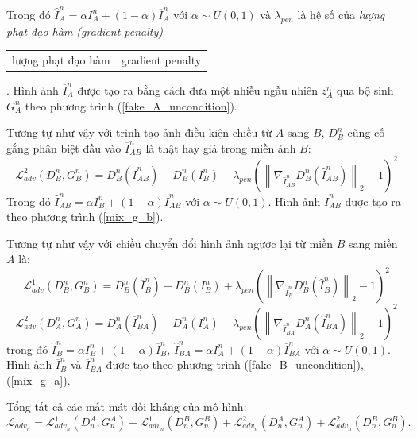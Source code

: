 \documentclass[12pt]{report}%
\newcommand{\word}[2]{%
    \refstepcounter{word}%
    \textit{#1 (#2)}%
    \addcontentsline{wor}{word}
    {\protect
    \begin{tabular}{p{6.2cm}p{6cm}}
        \MakeLowercase{#1} & \MakeLowercase{#2}\\
    \end{tabular}
    }
}
\begin{document}
Trong đó $\widehat I_A^n = \alpha I_A^n + \left( {1 - \alpha } \right)\overline I _A^n$ với $\alpha  \sim U\left( {0,1} \right)$ và $\lambda_{pen}$ là hệ số của \word{lượng phạt đạo hàm}{gradient penalty}. Hình ảnh $\overline I_A ^n$ được tạo ra bằng cách đưa một nhiễu ngẫu nhiên $z_A ^n$ qua bộ sinh $G_A ^n$ theo phương trình (\ref{fake_A_uncondition}).

Tương tự như vậy với trình tạo ảnh điều kiện chiều từ $A$ sang $B$, $D_B ^n$ cũng  cố gắng phân biệt đầu vào $\overline{I}_{AB} ^n$ là thật hay giả trong miền ảnh $B$:
\begin{equation}
    \mathcal{L}_{adv} ^2 \left( D_B ^n, G_B ^n \right)  = D_B^n\left( {\overline I _{AB}^n} \right) - D_B^n\left( {I_B^n} \right) + {\lambda _{pen}}{\left( {{{\left\| {{\nabla _{\widehat I_{AB}^n}}D_B^n\left( {\widehat I_{AB}^n} \right)} \right\|}_2} - 1} \right)^2}
\end{equation}
Trong đó $\widehat I_{AB}^n = \alpha I_B^n + \left( {1 - \alpha } \right)\overline I _{AB}^n$ với $\alpha  \sim U\left( {0,1} \right)$. Hình ảnh $\overline{I}_{AB} ^n$ được tạo ra theo phương trình (\ref{mix_g_b}).

Tương tự như vậy với chiều chuyển đổi hình ảnh ngược lại từ miền $B$ sang miền $A$ là:
\begin{equation}
    \mathcal{L}_{adv} ^1 \left( D_B ^n, G_B ^n \right) = D_B^n\left( {\overline I _B^n} \right) - D_B^n\left( {I_B^n} \right) + {\lambda _{pen}}{\left( {{{\left\| {{\nabla _{\widehat I_B^n}}D_B^n\left( {\widehat I_B^n} \right)} \right\|}_2} - 1} \right)^2}
\end{equation}
\begin{equation}
    \mathcal{L}_{adv} ^2 \left( D_A ^n, G_A ^n \right)  = D_A^n\left( {\overline I _{BA}^n} \right) - D_A^n\left( {I_A^n} \right) + {\lambda _{pen}}{\left( {{{\left\| {{\nabla _{\widehat I_{BA}^n}}D_A^n\left( {\widehat I_{BA}^n} \right)} \right\|}_2} - 1} \right)^2}
\end{equation}
trong đó $\widehat I_B^n = \alpha I_B^n + \left( {1 - \alpha } \right)\overline I _B^n$,  $\widehat I_{BA}^n = \alpha I_A^n + \left( {1 - \alpha } \right)\overline I _{BA}^n$ với $\alpha  \sim U\left( {0,1} \right)$. Hình ảnh $\overline{I}_B ^n$ và $\overline{I}_{BA} ^n$ được tạo theo phương trình (\ref{fake_B_uncondition}), (\ref{mix_g_a}).

Tổng tất cả các mất mát đối kháng của mô hình:
\begin{equation}\label{adv_loss}
     \mathcal{L}_{adv_n} = \mathcal{L}_{adv_n} ^1 \left( D_n ^A, G_n ^A \right) + \mathcal{L}_{adv_n} ^1 \left( D_n ^B, G_n ^B \right) + \mathcal{L}_{adv_n} ^2 \left( D_n ^A, G_n ^A \right) + \mathcal{L}_{adv_n} ^2 \left( D_n ^B, G_n ^B \right).
\end{equation}
\end{document}
